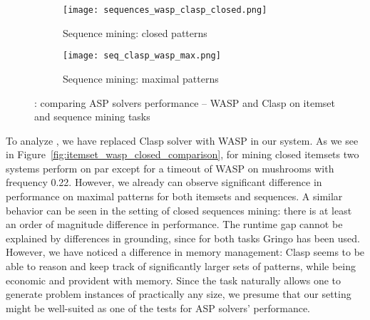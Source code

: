 \begin{figure}[tb]
  \begin{subfigure}[t]{\textwidth}
  \centering
   \texttt{[image: sequences\_wasp\_clasp\_closed.png]}
	\caption{Sequence mining: closed patterns}
	\label{fig:seq_wasp_closed_comparison}
  \end{subfigure}
  \begin{subfigure}[t]{\textwidth}
  \centering
   \texttt{[image: seq\_clasp\_wasp\_max.png]}
   \caption{Sequence mining: maximal patterns}
    \label{fig:seq_wasp_max_comparison}
  \end{subfigure}
	\caption{\qfour: comparing ASP solvers performance -- WASP and Clasp on itemset and sequence mining tasks}
\end{figure}


To analyze \qfour, we have replaced Clasp solver with WASP \parencite{wasp} in our system. As we see in Figure~\ref{fig:itemset_wasp_closed_comparison}, for mining closed itemsets two systems perform on par except for a timeout of WASP on mushrooms with frequency 0.22. However, we already can observe significant difference in performance on maximal patterns for both itemsets and sequences. A similar behavior can be seen in the setting of closed sequences mining: there is at least an order of magnitude difference in performance. The runtime gap cannot be explained by differences in grounding, since for both tasks Gringo has been used. However, we have noticed a difference in memory management: Clasp seems to be able to reason and keep track of significantly larger sets of patterns, while being economic and provident with memory. Since the task naturally allows one to generate problem instances of practically any size, we presume that our setting might be well-suited as one of the tests for ASP solvers' performance.

